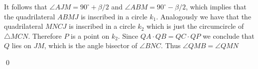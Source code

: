 \documentclass[a4paper, 12pt]{article}
\def\deg{^{\circ}}
\begin{document}
\begin{enumerate}
\begin{figure}[h]
\begin{center}
\begin{tikzpicture}[scale=3]
			\end{tikzpicture}
		\end{center}		
		\end{figure}
		\vspace{-5mm}
		
	 It follows that $\angle AJM=90\deg+\beta/2$ and $\angle ABM=90\deg- \beta/2$, which implies that the quadrilateral $ABMJ$ is inscribed in a circle $k_1$. Analogously we have that the quadrilateral $MNCJ$ is inscribed in a circle $k_2$ which is just the circumcircle of $\triangle MCN$. Therefore $P$ is a point on $k_2$. Since $QA \cdot QB =QC \cdot QP$ we conclude that $Q$ lies on $JM$, which is the angle bisector of $\angle BNC$. Thus $\angle QMB = \angle QMN$
	



\qed





    

\end{enumerate}
\end{document}
